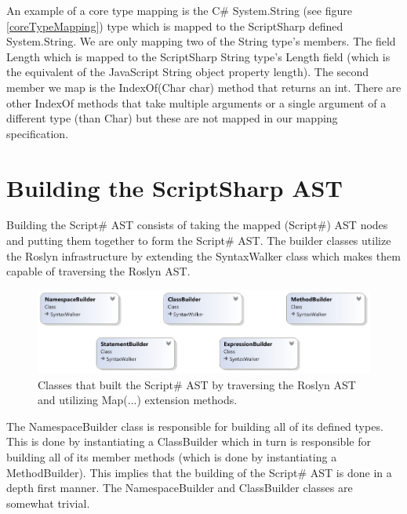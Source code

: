 			An example of a core type mapping is the C\# System.String (see figure \ref{coreTypeMapping}) type which is mapped to the ScriptSharp defined System.String. We are only mapping two of the String type’s members. The field Length which is mapped to the ScriptSharp String type’s Length field (which is the equivalent of the JavaScript String object property length). The second member we map is the IndexOf(Char char) method that returns an int. There are other IndexOf methods that take multiple arguments or a single argument of a different type (than Char) but these are not mapped in our mapping specification.

\section{Building the ScriptSharp AST} %
\label{sec:building_the_scriptsharp_ast}
	Building the Script\# AST consists of taking the mapped (Script\#) AST nodes and putting them together to form the Script\# AST. The builder classes utilize the Roslyn infrastructure by extending the SyntaxWalker class which makes them capable of traversing the Roslyn AST.
	\begin{figure}[H]
		\begin{center}
			\centerline{\includegraphics[width=16cm]{resources/images/BuilderClasses.png}}
		\end{center}
		\caption{Classes that built the Script\# AST by traversing the Roslyn AST and utilizing Map(...) extension methods.}
		\label{builderClasses}
	\end{figure}

	The NamespaceBuilder class is responsible for building all of its defined types. This is done by instantiating a ClassBuilder which in turn is responsible for building all of its member methods (which is done by instantiating a MethodBuilder). This implies that the building of the Script\# AST is done in a depth first manner. The NamespaceBuilder and ClassBuilder classes are somewhat trivial. 

